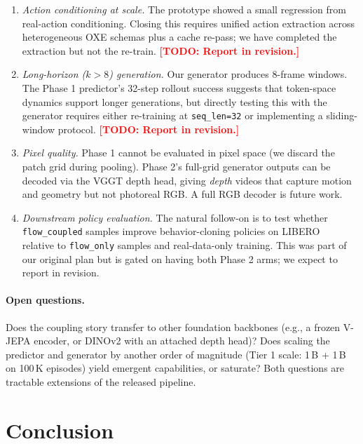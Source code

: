 \documentclass[10pt,letterpaper]{article}
\newcommand{\TODO}[1]{\textcolor{red}{\textbf{[TODO: #1]}}}
\begin{document}
\begin{enumerate}[leftmargin=*,itemsep=2pt]
\item \emph{Action conditioning at scale.} The prototype showed a small regression from real-action conditioning. Closing this requires unified action extraction across heterogeneous OXE schemas plus a cache re-pass; we have completed the extraction but not the re-train. \TODO{Report in revision.}

\item \emph{Long-horizon ($k > 8$) generation.} Our generator produces 8-frame windows. The Phase 1 predictor's 32-step rollout success suggests that token-space dynamics support longer generations, but directly testing this with the generator requires either re-training at \texttt{seq\_len=32} or implementing a sliding-window protocol. \TODO{Report in revision.}

\item \emph{Pixel quality.} Phase 1 cannot be evaluated in pixel space (we discard the patch grid during pooling). Phase 2's full-grid generator outputs can be decoded via the VGGT depth head, giving \emph{depth} videos that capture motion and geometry but not photoreal RGB. A full RGB decoder is future work.

\item \emph{Downstream policy evaluation.} The natural follow-on is to test whether \texttt{flow\_coupled} samples improve behavior-cloning policies on LIBERO~\citep{libero_2023} relative to \texttt{flow\_only} samples and real-data-only training. This was part of our original plan but is gated on having both Phase 2 arms; we expect to report in revision.
\end{enumerate}

\paragraph{Open questions.}

Does the coupling story transfer to other foundation backbones (e.g., a frozen V-JEPA encoder, or DINOv2 with an attached depth head)? Does scaling the predictor and generator by another order of magnitude (Tier 1 scale: 1\,B + 1\,B on 100\,K episodes) yield emergent capabilities, or saturate? Both questions are tractable extensions of the released pipeline.

\section{Conclusion}
\end{document}
